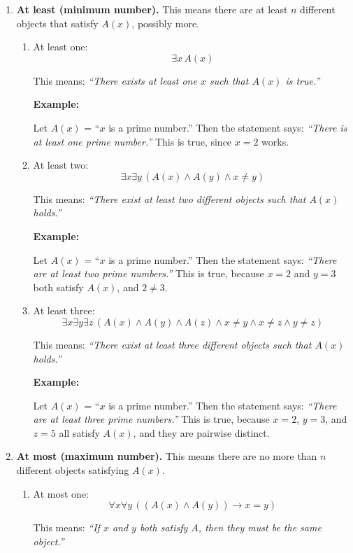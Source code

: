 \documentclass[12pt,a4paper,openany]{article}
\begin{document}
\begin{enumerate}
\item
\textbf{At least (minimum number).} This means there are at least \(n\)
different objects that satisfy \(A(x)\), possibly more.

\begin{enumerate}
\item
At least one:
\[
\exists x \, A(x)
\]

This means: \emph{``There exists at least one \(x\) such that \(A(x)\)
is true.''}

\textbf{Example:}

Let \(A(x)\) = ``\(x\) is a prime number.'' Then the statement says:
\emph{``There is at least one prime number.''} This is true, since
\(x = 2\) works.

\item
At least two:
\[
\exists x \exists y \, (A(x) \land A(y) \land x \neq y)
\]

This means: \emph{``There exist at least two different objects such
that \(A(x)\) holds.''}

\textbf{Example:}

Let \(A(x)\) = ``\(x\) is a prime number.'' Then the statement says:
\emph{``There are at least two prime numbers.''} This is true, because
\(x = 2\) and \(y = 3\) both satisfy \(A(x)\), and \(2 \neq 3\).

\item
At least three:
\[
\exists x \exists y \exists z \, (A(x) \land A(y) \land A(z) \land x \neq y \land x \neq z \land y \neq z)
\]

This means: \emph{``There exist at least three different objects such
that \(A(x)\) holds.''}

\textbf{Example:} 

Let \(A(x)\) = ``\(x\) is a prime number.'' Then the
statement says: \emph{``There are at least three prime numbers.''}
This is true, because \(x = 2\), \(y = 3\), and \(z = 5\) all satisfy
\(A(x)\), and they are pairwise distinct.
\end{enumerate}

\item
\textbf{At most (maximum number).} This means there are no more than \(n\)
different objects satisfying \(A(x)\).

\begin{enumerate}
\item
At most one:
\[
\forall x \forall y \, ((A(x) \land A(y)) \to x = y)
\]

This means: \emph{``If \(x\) and \(y\) both satisfy \(A\), then they
must be the same object.''}


\end{enumerate}
\end{enumerate}
\end{document}
